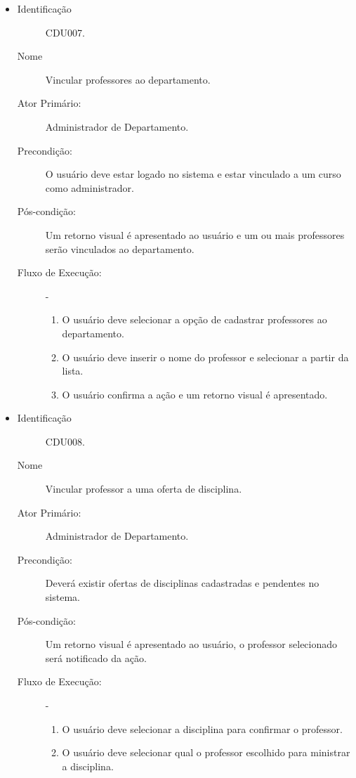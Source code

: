\begin{itemize}
    \item 
        \begin{description}
            \item[Identificação] CDU007.
            \item[Nome] Vincular professores ao departamento.
            \item[Ator Primário:] Administrador de Departamento.
            \item[Precondição:] O usuário deve estar logado no sistema e estar vinculado a um curso como administrador. 
            \item[Pós-condição:] Um retorno visual é apresentado ao usuário e um ou mais professores serão vinculados ao departamento.
            \item[Fluxo de Execução:] -
                \begin{enumerate}
                    \item O usuário deve selecionar a opção de cadastrar professores ao departamento.
                    \item O usuário deve inserir o nome do professor e selecionar a partir da lista.
                    \item O usuário confirma a ação e um retorno visual é apresentado.
                \end{enumerate}
        \end{description} 

    \vspace{10pt}

    \item 
        \begin{description}
           \item[Identificação] CDU008.
           \item[Nome] Vincular professor a uma oferta de disciplina.
           \item[Ator Primário:] Administrador de Departamento.
           \item[Precondição:] Deverá existir ofertas de disciplinas cadastradas e pendentes no sistema. 
           \item[Pós-condição:] Um retorno visual é apresentado ao usuário, o professor selecionado será notificado da ação.
           \item[Fluxo de Execução:] -
                \begin{enumerate}
                    \item O usuário deve selecionar a disciplina para confirmar o professor.
                    \item O usuário deve selecionar qual o professor escolhido para ministrar a disciplina.
                \end{enumerate}
        \end{description} 
    \vspace{10pt}


\end{itemize}
